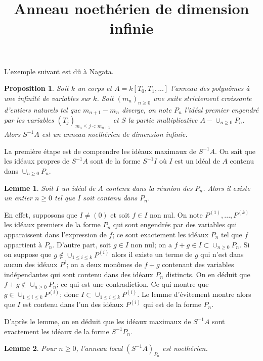 \documentclass{article}
\newtheorem{proposition}{Proposition}
\newtheorem{lemme}{Lemme}
\begin{document}
\title{Anneau noethérien de dimension infinie}
\maketitle

L'exemple suivant est dû à Nagata.
\begin{proposition}
Soit $k$ un corps et $A = k[T_0, T_1, ...]$ l'anneau des polynômes à une infinité de variables sur $k$. Soit $(m_n)_{n \geq 0}$ une suite strictement croissante d'entiers naturels tel que $m_{n+1} - m_n$ diverge, on note $P_n$ l'idéal premier engendré par les variables $(T_j)_{m_n \leq j < m_{n+1}}$ et $S$ la partie multiplicative $A-\cup_{n \geq 0}P_n$. Alors $S^{-1}A$ est un anneau noethérien de dimension infinie.
\end{proposition}

La première étape est de comprendre les idéaux maximaux de $S^{-1}A$.
On sait que les idéaux propres de $S^{-1}A$ sont de la forme $S^{-1}I$ où $I$ est un idéal de $A$ contenu dans $\cup_{n \geq 0}P_n$.

\begin{lemme}
Soit $I$ un idéal de $A$ contenu dans la réunion des $P_n$. Alors il existe un entier $n \geq 0$ tel que $I$ soit contenu dans $P_n$.
\end{lemme}

En effet, supposons que $I \neq (0)$ et soit $f \in I$ non nul. On note $P^{(1)}, ..., P^{(k)}$ les idéaux premiers de la forme $P_n$ qui sont engendrés par des variables qui apparaissent dans l'expression de $f$; ce sont exactement les idéaux $P_n$ tel que $f$ appartient à $P_n$. D'autre part, soit $g \in I$ non nul; on a $f+g \in I \subset \cup_{n \geq 0}P_n$. Si on suppose que $g \not\in \cup_{1 \leq i \leq k}P^{(i)}$ alors il existe un terme de $g$ qui n'est dans aucun des idéaux $P^i$; on a deux monômes de $f+g$ contenant des variables indépendantes qui sont contenu dans des idéaux $P_n$ distincts. On en déduit que $f+g \not\in \cup_{n \geq 0}P_n$; ce qui est une contradiction. Ce qui montre que $g \in \cup_{1 \leq i \leq k}P^{(i)}$; donc $I \subset \cup_{1 \leq i \leq k}P^{(i)}$. Le lemme d'évitement montre alors que $I$ est contenu dans l'un des idéaux $P^{(i)}$ qui est de la forme $P_n$.

D'après le lemme, on en déduit que les idéaux maximaux de $S^{-1}A$ sont exactement les idéaux de la forme $S^{-1}P_n$.
\begin{lemme}
Pour $n \geq 0$, l'anneau local $(S^{-1}A)_{P_n}$ est noethérien.
\end{lemme}
\end{document}
